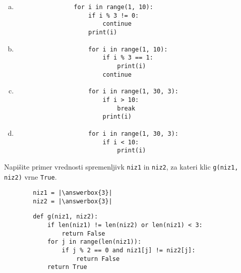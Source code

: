 \documentclass[arhiv, 10pt]{../izpit}
\newcommand{\inlinepy}[1]{\texttt{#1}}
\newcommand{\answerbox}[1]{\framebox{\vphantom{\large M}\hspace{#1cm}}}
\begin{document}
        \begin{multicols}{2}
        \begin{enumerate}[(a)]
\item 
            \begin{verbatim}
                for i in range(1, 10):
                    if i % 3 != 0:
                        continue
                    print(i)
            \end{verbatim}
        
\item 
                \begin{verbatim}
                    for i in range(1, 10):
                        if i % 3 == 1:
                            print(i)
                        continue
                \end{verbatim}
            
\item 
                \begin{verbatim}
                    for i in range(1, 30, 3):
                        if i > 10:
                            break
                        print(i)
                \end{verbatim}
            
\item 
                \begin{verbatim}
                    for i in range(1, 30, 3):
                        if i < 10:
                            print(i)
                \end{verbatim}
            
\end{enumerate}

        \end{multicols}
    
        \naloga*
        \begin{multicols}{2}
        \noindent
        Napišite primer vrednosti spremenljivk \inlinepy{niz1} in \inlinepy{niz2}, za kateri klic \inlinepy{g(niz1, niz2)} vrne \inlinepy{True}.
        \begin{verbatim}
        niz1 = |\answerbox{3}|
        niz2 = |\answerbox{3}|
        \end{verbatim}
        \vfil
        \columnbreak
        \begin{verbatim}
        def g(niz1, niz2):
            if len(niz1) != len(niz2) or len(niz1) < 3:
                return False
            for j in range(len(niz1)):
                if j % 2 == 0 and niz1[j] != niz2[j]:
                    return False
            return True
        \end{verbatim}
        \end{multicols}
    
\end{document}
